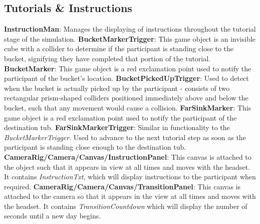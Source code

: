 \documentclass{article}
\begin{document}
\subsection{Tutorials \& Instructions} 
\textbf{InstructionMan}: Manages the displaying of instructions throughout the tutorial stage of the simulation.\newline \newline
\textbf{BucketMarkerTrigger}: This game object is an invisible cube with a collider to determine if the participant is standing close to the bucket, signifying they have completed that portion of the tutorial.\newline \newline
\textbf{BucketMarker}: This game object is a red exclamation point used to notify the participant of the bucket's location.\newline \newline
\textbf{BucketPickedUpTrigger}: Used to detect when the bucket is actually picked up by the participant - consists of two rectangular prism-shaped colliders positioned immediately above and below the bucket, such that any movement would cause a collision.\newline \newline
\textbf{FarSinkMarker}: This game object is a red exclamation point used to notify the participant of the destination tub.\newline \newline
\textbf{FarSinkMarkerTrigger}: Similar in functionality to the \textit{BucketMarkerTrigger}. Used to advance to the next tutorial step as soon as the participant is standing close enough to the destination tub.\newline \newline
\textbf{CameraRig\slash Camera\slash Canvas\slash InstructionPanel}: This canvas is attached to the  object such that it appears in view at all times and moves with the headset. It contains \textit{InstructionTxt}, which will display instructions to the participant when required. \newline \newline
\textbf{CameraRig/Camera/Canvas/TransitionPanel}: This canvas is attached to the camera so that it appears in the view at all times and moves with the headset. It contains \textit{TransitionCountdown} which will display the number of seconds until a new day begins. 
\end{document}
